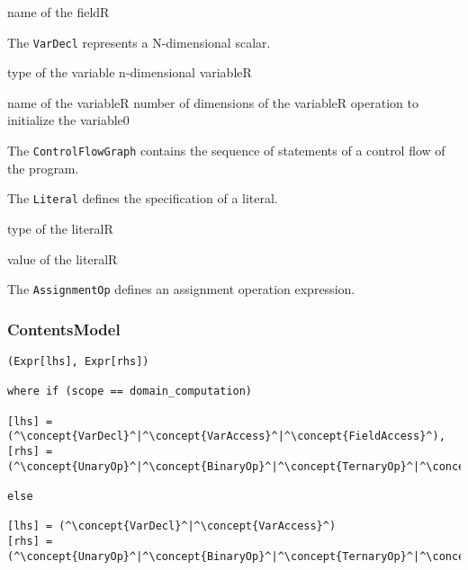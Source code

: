 \begin{HIRAttributes}
	{name of the field}{R}
\end{HIRAttributes}


The {\tt VarDecl} represents a N-dimensional scalar.

\begin{HIRChildElements}
	{type of the variable n-dimensional variable}{R}
\end{HIRChildElements}

\begin{HIRAttributes}
	{name of the variable}{R}
	{number of dimensions of the variable}{R}
	{operation to initialize the variable}{0}
\end{HIRAttributes}


The {\tt ControlFlowGraph} contains the sequence of statements of a control flow of the program. 


The {\tt Literal} defines the specification of a literal. 

\begin{HIRChildElements}
	{type of the literal}{R}
\end{HIRChildElements}

\begin{HIRAttributes}
	{value of the literal}{R}
\end{HIRAttributes}


The {\tt AssignmentOp} defines an assignment operation expression. 

\subsubsection*{ContentsModel}{}

\begin{lstlisting}[style=default]
(Expr[lhs], Expr[rhs])

where if (scope == domain_computation)

[lhs] = (^\concept{VarDecl}^|^\concept{VarAccess}^|^\concept{FieldAccess}^),
[rhs] =	(^\concept{UnaryOp}^|^\concept{BinaryOp}^|^\concept{TernaryOp}^|^\concept{Literal}^|^\concept{FieldAccess}^)

else

[lhs] = (^\concept{VarDecl}^|^\concept{VarAccess}^)
[rhs] =	(^\concept{UnaryOp}^|^\concept{BinaryOp}^|^\concept{TernaryOp}^|^\concept{Literal}^)
\end{lstlisting}


